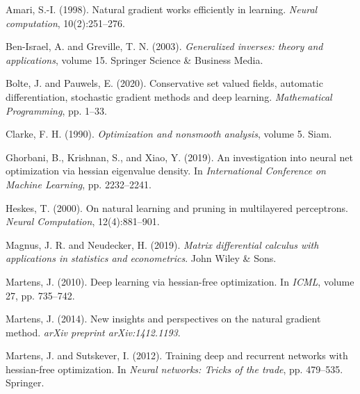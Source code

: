 \documentclass[11pt]{article}
\begin{document}

\begin{thebibliography}{10}
  Amari, S.-I. (1998).
  \newblock Natural gradient works efficiently in learning.
  \newblock \textit{Neural computation}, 10(2):251--276.

  Ben-Israel, A. and Greville, T. N. (2003).
  \newblock \textit{Generalized inverses: theory and applications}, volume 15.
  \newblock Springer Science \& Business Media.

  Bolte, J. and Pauwels, E. (2020).
  \newblock Conservative set valued fields, automatic differentiation, stochastic gradient methods and deep learning.
  \newblock \textit{Mathematical Programming}, pp. 1--33.

  Clarke, F. H. (1990).
  \newblock \textit{Optimization and nonsmooth analysis}, volume 5.
  \newblock Siam.

  Ghorbani, B., Krishnan, S., and Xiao, Y. (2019).
  \newblock An investigation into neural net optimization via hessian eigenvalue density.
  \newblock In \textit{International Conference on Machine Learning}, pp. 2232--2241.

  Heskes, T. (2000).
  \newblock On natural learning and pruning in multilayered perceptrons.
  \newblock \textit{Neural Computation}, 12(4):881--901.

  Magnus, J. R. and Neudecker, H. (2019).
  \newblock \textit{Matrix differential calculus with applications in statistics and econometrics}.
  \newblock John Wiley \& Sons.

  Martens, J. (2010).
  \newblock Deep learning via hessian-free optimization.
  \newblock In \textit{ICML}, volume 27, pp. 735--742.

  Martens, J. (2014).
  \newblock New insights and perspectives on the natural gradient method.
  \newblock \textit{arXiv preprint arXiv:1412.1193}.

  Martens, J. and Sutskever, I. (2012).
  \newblock Training deep and recurrent networks with hessian-free optimization.
  \newblock In \textit{Neural networks: Tricks of the trade}, pp. 479--535. Springer.


\end{thebibliography}
\end{document}

